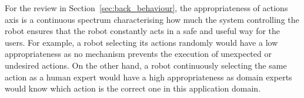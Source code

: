     
    
    For the review in Section~\ref{sec:back_behaviour}, the appropriateness of actions axis is a continuous spectrum characterising how much the system controlling the robot ensures that the robot constantly acts in a safe and useful way for the users. For example, a robot selecting its actions randomly would have a low appropriateness as no mechanism prevents the execution of unexpected or undesired actions. On the other hand, a robot continuously selecting the same action as a human expert would have a high appropriateness as domain experts would know which action is the correct one in this application domain.


